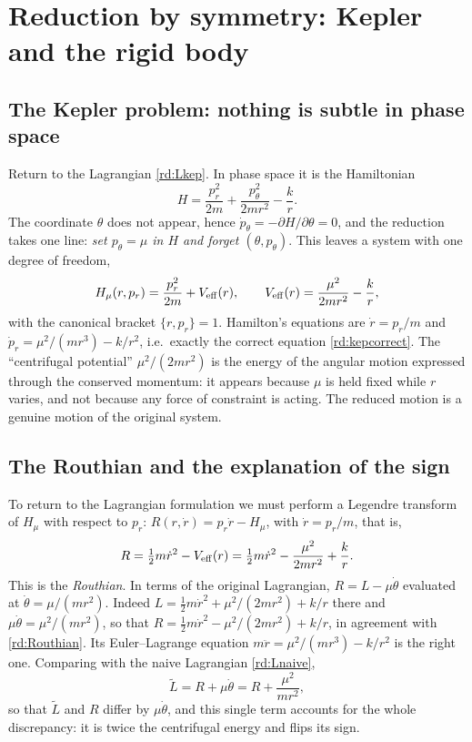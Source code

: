 \section{Reduction by symmetry: Kepler and the rigid body}\label{rd:sec:sym}

\subsection{The Kepler problem: nothing is subtle in phase space}\label{rd:sec:kepham}

Return to the Lagrangian \eqref{rd:Lkep}. In phase space it is the Hamiltonian
\begin{equation}\label{rd:Hkep}
H=\frac{p_r^2}{2m}+\frac{p_\theta^2}{2mr^2}-\frac kr .
\end{equation}
The coordinate $\theta$ does not appear, hence $\dot p_\theta=-\partial H/\partial\theta=0$, and the reduction takes one line: \emph{set $p_\theta=\mu$ in $H$ and forget $(\theta,p_\theta)$}. This leaves a system with one degree of freedom,
\begin{equation}\label{rd:Hmu}
H_\mu(r,p_r)=\frac{p_r^2}{2m}+V_{\rm eff}(r),\qquad V_{\rm eff}(r)=\frac{\mu^2}{2mr^2}-\frac kr,
\end{equation}
with the canonical bracket $\{r,p_r\}=1$. Hamilton's equations are $\dot r=p_r/m$ and $\dot p_r=\mu^2/(mr^3)-k/r^2$, i.e.\ exactly the correct equation \eqref{rd:kepcorrect}. The ``centrifugal potential'' $\mu^2/(2mr^2)$ is the energy of the angular motion expressed through the conserved momentum: it appears because $\mu$ is held fixed while $r$ varies, and not because any force of constraint is acting. The reduced motion is a genuine motion of the original system.

\subsection{The Routhian and the explanation of the sign}\label{rd:sec:routh}

To return to the Lagrangian formulation we must perform a Legendre transform of $H_\mu$ with respect to $p_r$: $R(r,\dot r)=p_r\dot r-H_\mu$, with $\dot r=p_r/m$, that is,
\begin{equation}\label{rd:Routhian}
R=\tfrac12m\dot r^2-V_{\rm eff}(r)=\tfrac12m\dot r^2-\frac{\mu^2}{2mr^2}+\frac kr .
\end{equation}
This is the \emph{Routhian}. In terms of the original Lagrangian, $R=L-\mu\dot\theta$ evaluated at $\dot\theta=\mu/(mr^2)$. Indeed $L=\tfrac12m\dot r^2+\mu^2/(2mr^2)+k/r$ there and $\mu\dot\theta=\mu^2/(mr^2)$, so that $R=\tfrac12m\dot r^2-\mu^2/(2mr^2)+k/r$, in agreement with \eqref{rd:Routhian}. Its Euler--Lagrange equation $m\ddot r=\mu^2/(mr^3)-k/r^2$ is the right one. Comparing with the naive Lagrangian \eqref{rd:Lnaive},
\[
\tilde L=R+\mu\dot\theta=R+\frac{\mu^2}{mr^2},
\]
so that $\tilde L$ and $R$ differ by $\mu\dot\theta$, and this single term accounts for the whole discrepancy: it is twice the centrifugal energy and flips its sign.

